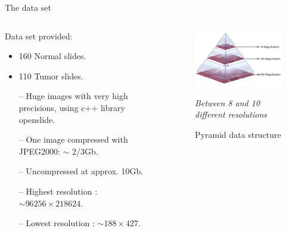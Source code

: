 \documentclass{beamer}
\begin{document}
\begin{frame}{The data set}
\begin{columns}[T] %
\begin{column}{.5\textwidth}
Data set provided:
\begin{itemize}
\item 160 Normal slides.
\item 110 Tumor slides.
\end{itemize} 

\begin{small}

\begin{itemize}
\item [--] Huge images with very high precisions, using c++ library openslide. 
\item [--] One image compressed with JPEG2000: $\sim$ 2/3Gb. 
\item [--] Uncompressed at approx. 10Gb. 
\item [--] Highest resolution : $\sim 96 256\times 218624$.
\item [--] Lowest resolution : $\sim 188 \times 427$. 
\end{itemize}
\end{small}

\end{column}%
\hfill%
\begin{column}{.5\textwidth}
\begin{figure}[!ht]
\centering
\includegraphics[width=\textwidth]{pyramid.png}
\caption{Pyramid data structure}
\textit{Between 8 and 10 different resolutions}
\label{}
\end{figure}
\end{column}%
\end{columns}

\end{frame}
\end{document}
